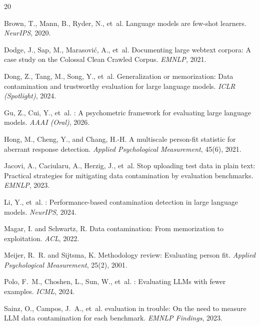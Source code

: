 \documentclass[11pt,a4paper]{article}
\begin{document}
\begin{thebibliography}{20}

Brown, T., Mann, B., Ryder, N., et~al.
\newblock Language models are few-shot learners.
\newblock \emph{NeurIPS}, 2020.

Dodge, J., Sap, M., Marasovi{\'c}, A., et~al.
\newblock Documenting large webtext corpora: A case study on the {C}olossal {C}lean {C}rawled {C}orpus.
\newblock \emph{EMNLP}, 2021.

Dong, Z., Tang, M., Song, Y., et~al.
\newblock Generalization or memorization: Data contamination and trustworthy evaluation for large language models.
\newblock \emph{ICLR (Spotlight)}, 2024.

Gu, Z., Cui, Y., et~al.
: A psychometric framework for evaluating large language models.
\newblock \emph{AAAI (Oral)}, 2026.

Hong, M., Cheng, Y., and Chang, H.-H.
\newblock A multiscale person-fit statistic for aberrant response detection.
\newblock \emph{Applied Psychological Measurement}, 45(6), 2021.

Jacovi, A., Caciularu, A., Herzig, J., et~al.
\newblock Stop uploading test data in plain text: Practical strategies for mitigating data contamination by evaluation benchmarks.
\newblock \emph{EMNLP}, 2023.

Li, Y., et~al.
: Performance-based contamination detection in large language models.
\newblock \emph{NeurIPS}, 2024.

Magar, I. and Schwartz, R.
\newblock Data contamination: From memorization to exploitation.
\newblock \emph{ACL}, 2022.

Meijer, R.~R. and Sijtsma, K.
\newblock Methodology review: Evaluating person fit.
\newblock \emph{Applied Psychological Measurement}, 25(2), 2001.

Polo, F.~M., Choshen, L., Sun, W., et~al.
: Evaluating {LLM}s with fewer examples.
\newblock \emph{ICML}, 2024.

Sainz, O., Campos, J.~A., et~al.
 evaluation in trouble: On the need to measure {LLM} data contamination for each benchmark.
\newblock \emph{EMNLP Findings}, 2023.


\end{thebibliography}
\end{document}
